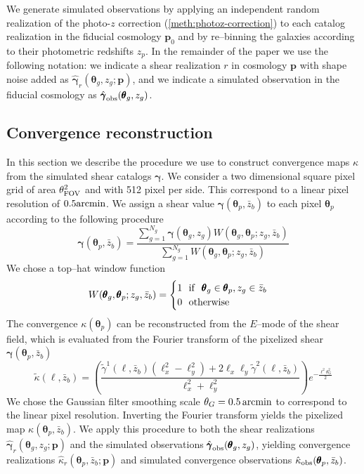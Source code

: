 \documentclass[reprint,aps,prd,superscriptaddress,showkeys,showpacs]{revtex4-1}
\newcommand{\bb}[1]{\mathbf{#1}}
\newcommand{\h}[1]{\hat{#1}}
\begin{document}
We generate simulated observations by applying an independent random realization of the photo-$z$ correction (\ref{meth:photoz-correction}) to each catalog realization in the fiducial cosmology $\bb{p}_0$ and by re--binning the galaxies according to their photometric redshifts $z_p$. In the remainder of the paper we use the following notation: we indicate a shear realization $r$ in cosmology $\bb{p}$ with shape noise added as $\h{\pmb{\gamma}}_r(\pmb{\theta}_g,z_g;\bb{p})$, and we indicate a simulated observation in the fiducial cosmology as $\h{\pmb{\gamma}}_{\rm obs}(\pmb{\theta}_g,z_g)$.           


\subsection{Convergence reconstruction}
In this section we describe the procedure we use to construct convergence maps $\kappa$ from the simulated shear catalogs $\pmb{\gamma}$. We consider a two dimensional square pixel grid of area $\theta_{\rm FOV}^2$ and with 512 pixel per side. This correspond to a linear pixel resolution of $0.5 \rm{arcmin}$. We assign a shear value $\pmb{\gamma}(\pmb{\theta}_p,\bar{z}_b)$ to each pixel $\pmb{\theta}_p$ according to the following procedure
\begin{equation}
\pmb{\gamma}(\pmb{\theta}_p,\bar{z}_b) = \frac{\sum_{g=1}^{N_g}\pmb{\gamma}(\pmb{\theta}_g,z_g)W(\pmb{\theta}_g,\pmb{\theta}_p;z_g,\bar{z}_b)}{\sum_{g=1}^{N_g}W(\pmb{\theta}_g,\pmb{\theta}_p;z_g,\bar{z}_b)}
\end{equation}   
%
We chose a top--hat window function
\begin{equation}
W(\pmb{\theta}_g,\pmb{\theta}_p;z_g,\bar{z}_b) = 
\begin{cases}
1 \,\,\,\,{\rm if}\,\,\,\, \pmb{\theta}_g\in\pmb{\theta}_p,z_g\in\bar{z}_b \\
0 \,\,\,\,{\rm otherwise}
\end{cases}
\end{equation} 
%
The convergence $\kappa(\pmb{\theta}_p)$ can be reconstructed from the $E$--mode of the shear field, which is evaluated from the Fourier transform of the pixelized shear $\pmb{\gamma}(\pmb{\theta}_p,\bar{z}_b)$
\begin{equation}
\label{meth:psdefinition}
\tilde\kappa(\pmb{\ell},\bar{z}_b) = \left(\frac{\tilde{\gamma}^1(\pmb{\ell},\bar{z}_b)(\ell_x^2-\ell_y^2)+2\ell_x\ell_y\tilde{\gamma}^2(\pmb{\ell},\bar{z}_b)}{\ell_x^2+\ell_y^2}\right) e^{-\frac{\ell^2\theta_G^2}{2}}
\end{equation}
%
We chose the Gaussian filter smoothing scale $\theta_G=0.5\,{\rm arcmin}$ to correspond to the linear pixel resolution. Inverting the Fourier transform yields the pixelized map $\kappa(\pmb{\theta}_p,\bar{z}_b)$. We apply this procedure to both the shear realizations $\h{\pmb{\gamma}}_r(\pmb{\theta}_g,z_g;\bb{p})$ and the simulated observations $\h{\pmb{\gamma}}_{\rm obs}(\pmb{\theta}_g,z_g)$, yielding convergence realizations $\h{\kappa}_r(\pmb{\theta}_p,\bar{z}_b;\bb{p})$ and simulated convergence observations $\h{\kappa}_{\rm obs}(\pmb{\theta}_p,\bar{z}_b)$. 
\end{document}
